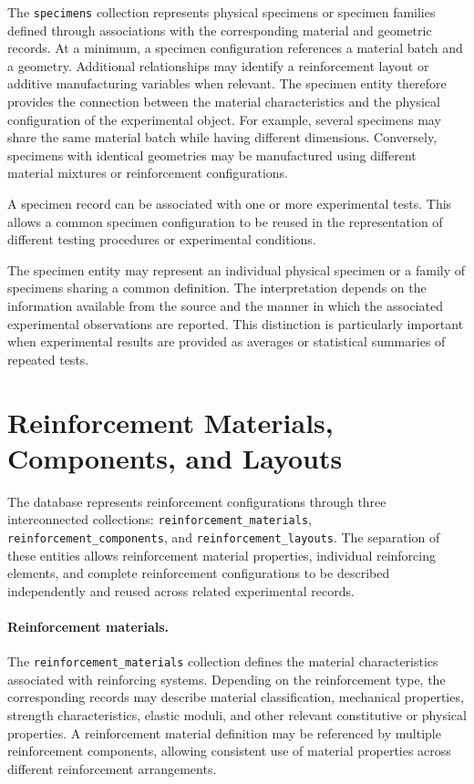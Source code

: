 The \texttt{specimens} collection represents
physical specimens or specimen families
defined through associations with the
corresponding material and geometric records.
At a minimum, a specimen configuration
references a material batch and a geometry.
Additional relationships may identify a
reinforcement layout or additive manufacturing
variables when relevant.
The specimen entity therefore provides
the connection between the material
characteristics and the physical
configuration of the experimental object.
For example, several specimens may share
the same material batch while having
different dimensions. Conversely, specimens
with identical geometries may be manufactured
using different material mixtures or
reinforcement configurations.

A specimen record can be associated with
one or more experimental tests. This
allows a common specimen configuration
to be reused in the representation of
different testing procedures or experimental
conditions.

The specimen entity may represent an
individual physical specimen or a family
of specimens sharing a common definition.
The interpretation depends on the
information available from the source
and the manner in which the associated
experimental observations are reported.
This distinction is particularly important
when experimental results are provided
as averages or statistical summaries
of repeated tests.


\section{Reinforcement Materials, Components, and Layouts}

The database represents reinforcement
configurations through three interconnected
collections:
\texttt{reinforcement\_materials},
\texttt{reinforcement\_components}, and
\texttt{reinforcement\_layouts}.
The separation of these entities allows
reinforcement material properties,
individual reinforcing elements, and
complete reinforcement configurations
to be described independently and reused
across related experimental records.

\paragraph{Reinforcement materials.}

The \texttt{reinforcement\_materials}
collection defines the material
characteristics associated with reinforcing
systems.
Depending on the reinforcement type,
the corresponding records may describe
material classification, mechanical
properties, strength characteristics,
elastic moduli, and other relevant
constitutive or physical properties.
A reinforcement material definition may
be referenced by multiple reinforcement
components, allowing consistent use of
material properties across different
reinforcement arrangements.


